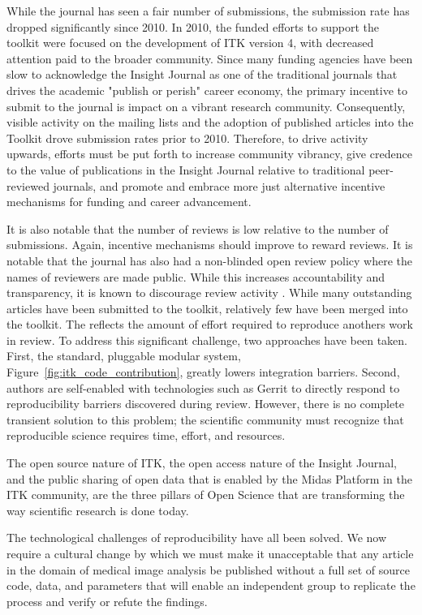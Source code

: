 \documentclass{frontiersENG} %
\begin{document}
While the journal has seen a fair number of submissions, the submission rate
has dropped significantly since 2010. In 2010, the funded efforts to support
the toolkit were focused on the development of ITK version 4, with decreased
attention paid to the broader community.  Since many funding agencies have been
slow to acknowledge the Insight Journal as one of the traditional journals
that drives the academic "publish or perish" career economy, the primary
incentive to submit to the journal is impact on a vibrant research community.
Consequently, visible activity on the mailing lists and the adoption of published
articles into the Toolkit drove submission rates prior to 2010. Therefore, to
drive activity upwards, efforts must be put forth to increase community
vibrancy, give credence to the value of publications in the Insight Journal
relative to traditional peer-reviewed journals, and promote and embrace more
just alternative incentive mechanisms for funding and career advancement.

It is also notable that the number of reviews is low relative to the number of
submissions. Again, incentive mechanisms should improve to reward reviews.  It
is notable that the journal has also had a non-blinded open review policy
where the names of reviewers are made public. While this increases
accountability and transparency, it is known to discourage review activity
\cite{Rooyen1999,Walsh2000}. While many outstanding articles have been
submitted to the toolkit, relatively few have been merged into the toolkit.
The reflects the amount of effort required to reproduce anothers work in
review.  To address this significant challenge, two approaches have been
taken.  First, the standard, pluggable modular system,
Figure~\ref{fig:itk_code_contribution}, greatly lowers integration barriers.
Second, authors are self-enabled with technologies such as Gerrit to directly respond
to reproducibility barriers discovered during review. However, there is no
complete transient solution to this
problem; the scientific community must recognize that reproducible science
requires time, effort, and resources.

The open source nature of ITK, the open access nature of the Insight Journal,
and the public sharing of open data that is enabled by the Midas Platform in
the ITK community, are the three pillars of Open Science that are transforming
the way scientific research is done today.

The technological challenges of reproducibility have all been solved. We now
require a cultural change by which we must make it unacceptable that any
article in the domain of medical image analysis be published without a full
set of source code, data, and parameters that will enable an independent group
to replicate the process and verify or refute the findings.
\end{document}
